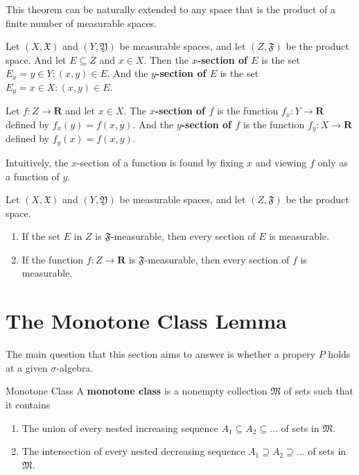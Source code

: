 This theorem can be naturally extended to any space that is the product of a finite number of measurable spaces.

\begin{definition}
	Let $(X, \mathfrak{X})$ and $(Y, \mathfrak{Y})$ be measurable spaces, and let $(Z, \mathfrak{F})$ be the product space. And let $E \subseteq Z$ and $x \in X$. Then the \textbf{$x$-section of $E$} is the set $E_x = {y \in Y : (x, y) \in E}$. And the \textbf{$y$-section of $E$} is the set $E_y = {x \in X : (x, y) \in E}$.

	Let $f : Z \longrightarrow \textbf{R}$ and let $x \in X$. The \textbf{$x$-section of $f$} is the function $f_x : Y \longrightarrow \textbf{R}$ defined by $f_x(y) = f(x,y)$. And the \textbf{$y$-section of $f$} is the function $f_y : X \longrightarrow \textbf{R}$ defined by $f_y(x) = f(x,y)$.
\end{definition}

Intuitively, the $x$-section of a function is found by fixing $x$ and viewing $f$ only as a function of $y$.

\begin{theorem}[]{}{}
	Let $(X, \mathfrak{X})$ and $(Y, \mathfrak{Y})$ be measurable spaces, and let $(Z, \mathfrak{F})$ be the product space.
	\begin{enumerate}
		\item If the set $E$ in $Z$ is $\mathfrak{F}$-measurable, then every section of $E$ is measurable. 
		\item If the function $f : Z \longrightarrow \textbf{R}$ is $\mathfrak{F}$-measurable, then every section of $f$ is measurable. 
	\end{enumerate}
\end{theorem}

\section{The Monotone Class Lemma}

The main question that this section aims to answer is whether a propery $P$ holds at a given $\sigma$-algebra. 

\begin{definition}[]{Monotone Class}{}
	A \textbf{monotone class} is a nonempty collection $\mathfrak{M}$ of sets such that it contains
	\begin{enumerate}
		\item The union of every nested increasing sequence $A_1 \subseteq A_2 \subseteq \ldots $ of sets in $\mathfrak{M}$.
		\item The intersection of every nested decreasing sequence $A_1 \supseteq A_2 \supseteq \ldots $ of sets in $\mathfrak{M}$.
	\end{enumerate}
\end{definition}

